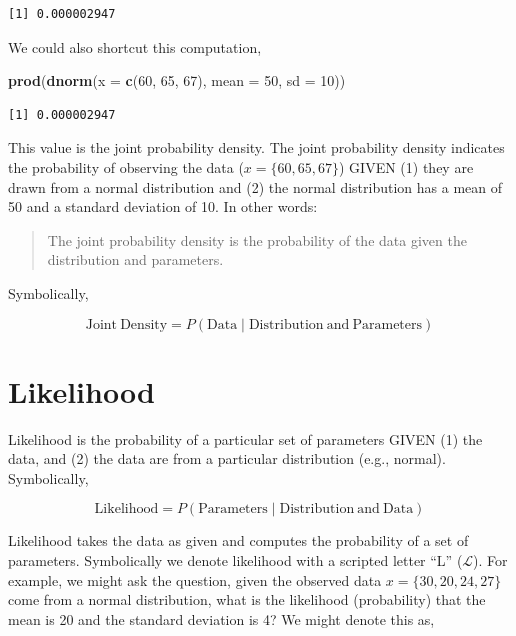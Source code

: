 \documentclass[]{book}
\newenvironment{Shaded}{\begin{snugshade}}{\end{snugshade}}
\newcommand{\DataTypeTok}[1]{\textcolor[rgb]{0.13,0.29,0.53}{#1}}
\newcommand{\DecValTok}[1]{\textcolor[rgb]{0.00,0.00,0.81}{#1}}
\newcommand{\KeywordTok}[1]{\textcolor[rgb]{0.13,0.29,0.53}{\textbf{#1}}}
\newcommand{\NormalTok}[1]{#1}
\begin{document}
\begin{verbatim}
[1] 0.000002947
\end{verbatim}

We could also shortcut this computation,

\begin{Shaded}
\begin{Highlighting}[]
\KeywordTok{prod}\NormalTok{(}\KeywordTok{dnorm}\NormalTok{(}\DataTypeTok{x =} \KeywordTok{c}\NormalTok{(}\DecValTok{60}\NormalTok{, }\DecValTok{65}\NormalTok{, }\DecValTok{67}\NormalTok{), }\DataTypeTok{mean =} \DecValTok{50}\NormalTok{, }\DataTypeTok{sd =} \DecValTok{10}\NormalTok{))}
\end{Highlighting}
\end{Shaded}

\begin{verbatim}
[1] 0.000002947
\end{verbatim}

This value is the joint probability density. The joint probability density indicates the probability of observing the data (\(x =\{60, 65, 67\}\)) GIVEN (1) they are drawn from a normal distribution and (2) the normal distribution has a mean of 50 and a standard deviation of 10. In other words:

\begin{quote}
The joint probability density is the probability of the data given the distribution and parameters.
\end{quote}

Symbolically,

\[
\mathrm{Joint~Density} = P(\mathrm{Data} \mid \mathrm{Distribution~and~Parameters})
\]

\hypertarget{likelihood}{%
\section{Likelihood}\label{likelihood}}

Likelihood is the probability of a particular set of parameters GIVEN (1) the data, and (2) the data are from a particular distribution (e.g., normal). Symbolically,

\[
\mathrm{Likelihood} = P(\mathrm{Parameters} \mid \mathrm{Distribution~and~Data})
\]

Likelihood takes the data as given and computes the probability of a set of parameters. Symbolically we denote likelihood with a scripted letter ``L'' (\(\mathcal{L}\)). For example, we might ask the question, given the observed data \(x = \{30, 20, 24, 27\}\) come from a normal distribution, what is the likelihood (probability) that the mean is 20 and the standard deviation is 4? We might denote this as,
\end{document}
